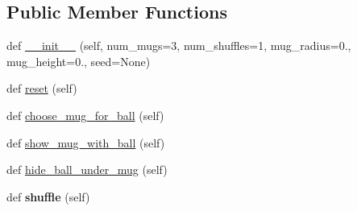\subsection*{Public Member Functions}
\begin{DoxyCompactItemize}
\item 
def \hyperlink{classthimblerigger_1_1Thimblerigger_acae8ab714f54c3f701dfc2dd6fb22704}{\+\_\+\+\_\+init\+\_\+\+\_\+} (self, num\+\_\+mugs=3, num\+\_\+shuffles=1, mug\+\_\+radius=0., mug\+\_\+height=0., seed=None)
\item 
def \hyperlink{classthimblerigger_1_1Thimblerigger_a7198939b327adbba670b58b310556d05}{reset} (self)
\item 
def \hyperlink{classthimblerigger_1_1Thimblerigger_aece869c0bf0650d676c9d171224a929e}{choose\+\_\+mug\+\_\+for\+\_\+ball} (self)
\item 
def \hyperlink{classthimblerigger_1_1Thimblerigger_acc7947cf77d97be49bb797783a21c671}{show\+\_\+mug\+\_\+with\+\_\+ball} (self)
\item 
def \hyperlink{classthimblerigger_1_1Thimblerigger_a508a70bc68cb5f8fa4b01ddecf584de5}{hide\+\_\+ball\+\_\+under\+\_\+mug} (self)
\item 
def {\bfseries shuffle} (self)\hypertarget{classthimblerigger_1_1Thimblerigger_aebfd2a3be6761c6ce4e3c9c12111ee85}{}\label{classthimblerigger_1_1Thimblerigger_aebfd2a3be6761c6ce4e3c9c12111ee85}

\end{DoxyCompactItemize}
